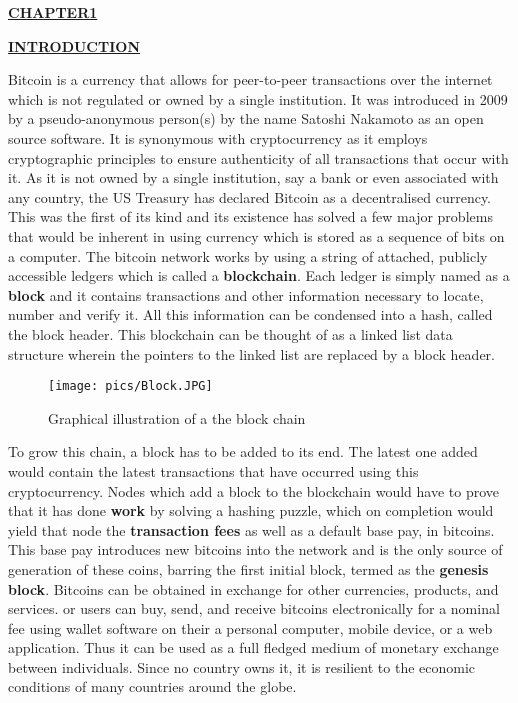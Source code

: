 \documentclass[12pt,a4paper]{report}
\begin{document}
\begin{flushleft}
\begin{center}\underline{  \Large\textbf{CHAPTER1}}\end{center}
\begin{center}\underline{ \Large \textbf{INTRODUCTION}}\end{center}
\vspace{10mm} 
Bitcoin is a currency that allows for peer-to-peer transactions over the internet which is not regulated or owned by a single institution. It was introduced in 2009 by a pseudo-anonymous person(s) by the name Satoshi Nakamoto as an open source software.
\vspace{10mm}
It is synonymous with cryptocurrency as it employs cryptographic principles to ensure authenticity of all transactions that occur with it. As it is not owned by a single institution, say a bank or even associated with any country, the US Treasury has declared Bitcoin as a decentralised currency. This was the first of its kind and its existence has solved a few major problems that would be inherent in using currency which is stored as a sequence of bits on a computer.
The bitcoin network works by using a string of attached, publicly accessible ledgers which is called a \textbf{blockchain}. Each ledger is simply named as a \textbf{block} and it contains transactions and other information necessary to locate, number and verify it. All this information can be condensed into a hash, called the block header. This blockchain can be thought of as a linked list data structure wherein the pointers to the linked list are replaced by a block header.

\begin{figure}[h]
\centering
\caption{Graphical illustration of a the block chain}
\texttt{[image: pics/Block.JPG]}

\end{figure}

\vspace{5mm}
To grow this chain, a block has to be added to its end. The latest one added would contain the latest transactions that have occurred using this cryptocurrency. Nodes which add a block to the blockchain would have to prove that it has done \textbf{work} by solving a hashing puzzle, which on completion would yield that node the \textbf{transaction fees} as well as a default base pay, in bitcoins. This base pay introduces new bitcoins into the network and is the only source of generation of these coins, barring the first initial block, termed as the \textbf{genesis block}.
\vspace{10mm}
Bitcoins can be obtained in exchange for other currencies, products, and services. or users can buy, send, and receive bitcoins electronically for a nominal fee using wallet software on their a personal computer, mobile device, or a web application.
Thus it can be used as a full fledged medium of monetary exchange between individuals. Since no country owns it, it is resilient to the economic conditions of many countries around the globe.


\end{flushleft}
\end{document}
